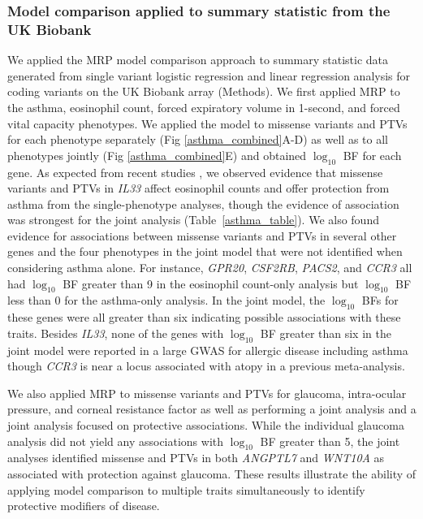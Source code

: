 \subsubsection*{Model comparison applied to summary statistic from the UK Biobank}
We applied the MRP model comparison approach to summary statistic data generated from single variant logistic regression and linear regression analysis for coding variants on the UK Biobank array (Methods). We first applied MRP to the asthma, eosinophil count, forced expiratory volume in 1-second, and forced vital capacity phenotypes. We applied the model to missense variants and PTVs for each phenotype separately (Fig \ref{asthma_combined}A-D) as well as to all phenotypes jointly (Fig \ref{asthma_combined}E) and obtained $\log_{10}$ BF for each gene. As expected from recent studies \cite{DeBoever179762, 10.1371/journal.pgen.1006659}, we observed evidence that missense variants and PTVs in \textit{IL33} affect eosinophil counts and offer protection from asthma from the single-phenotype analyses, though the evidence of association was strongest for the joint analysis (Table~\ref{asthma_table}). We also found evidence for associations between missense variants and PTVs in several other genes and the four phenotypes in the joint model that were not identified when considering asthma alone. For instance, \textit{GPR20}, \textit{CSF2RB}, \textit{PACS2}, and \textit{CCR3} all had $\log_{10}$ BF greater than 9 in the eosinophil count-only analysis but $\log_{10}$ BF less than 0 for the asthma-only analysis. In the joint model, the $\log_{10}$ BFs for these genes were all greater than six indicating possible associations with these traits. Besides \textit{IL33}, none of the genes with $\log_{10}$ BF greater than six in the joint model were reported in a large GWAS for allergic disease including asthma\cite{Ferreira:2017ba} though \textit{CCR3} is near a locus associated with atopy in a previous meta-analysis\cite{Ober:2011jk}. 

We also applied MRP to missense variants and PTVs for glaucoma, intra-ocular pressure, and corneal resistance factor as well as performing a joint analysis and a joint analysis focused on protective associations. While the individual glaucoma analysis did not yield any associations with $\log_{10}$ BF greater than 5, the joint analyses identified missense and PTVs in both \textit{ANGPTL7} and \textit{WNT10A} as associated with protection against glaucoma. These results illustrate the ability of applying model comparison to multiple traits simultaneously to identify protective modifiers of disease. 

